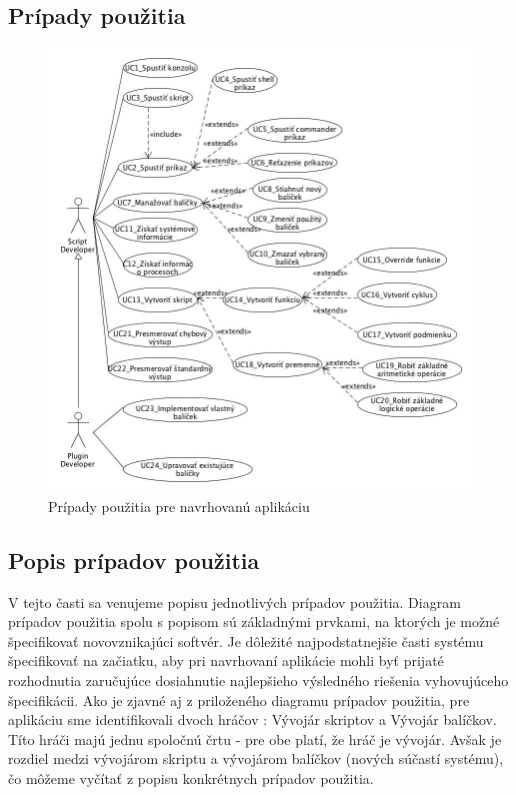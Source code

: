 {\subsection{Prípady použitia}
\indent
\begin{figure}[H]
	\centering
	\includegraphics[width=\linewidth]{img/usecase.jpg}
	\caption{Prípady použitia pre navrhovanú aplikáciu}
	\label{fig:test}
\end{figure}
\newpage
\subsection{Popis prípadov použitia}
\indent V tejto časti sa venujeme popisu jednotlivých prípadov použitia. Diagram prípadov použitia spolu s popisom sú základnými prvkami, na ktorých je možné špecifikovať novovznikajúci softvér. Je dôležité najpodstatnejšie časti systému špecifikovať na začiatku, aby pri navrhovaní aplikácie mohli byť prijaté rozhodnutia zaručujúce dosiahnutie najlepšieho výsledného riešenia vyhovujúceho špecifikácii. Ako je zjavné aj z priloženého diagramu prípadov použitia, pre aplikáciu sme identifikovali dvoch hráčov : Vývojár skriptov a Vývojár balíčkov. Títo hráči majú jednu spoločnú črtu - pre obe platí, že hráč je vývojár. Avšak je rozdiel medzi vývojárom skriptu a vývojárom balíčkov (nových súčastí systému), čo môžeme vyčítať z popisu konkrétnych prípadov použitia.
}
